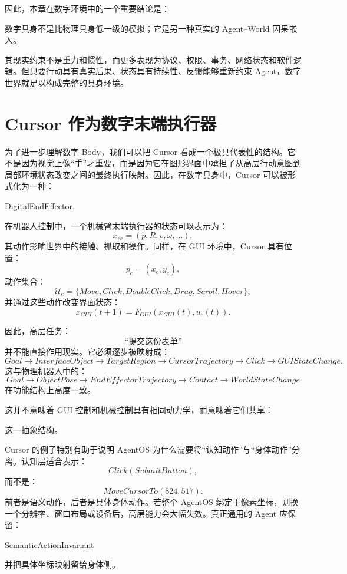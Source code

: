 因此，本章在数字环境中的一个重要结论是：
\begin{conclusion}
数字具身不是比物理具身低一级的模拟；它是另一种真实的 Agent--World 因果嵌入。
\end{conclusion}
其现实约束不是重力和惯性，而更多表现为协议、权限、事务、网络状态和软件逻辑。但只要行动具有真实后果、状态具有持续性、反馈能够重新约束 Agent，数字世界就足以构成完整的具身环境。

\section{Cursor 作为数字末端执行器}

为了进一步理解数字 Body，我们可以把 Cursor 看成一个极具代表性的结构。它不是因为视觉上像“手”才重要，而是因为它在图形界面中承担了从高层行动意图到局部环境状态改变之间的最终执行映射。因此，在数字具身中，Cursor 可以被形式化为一种：
\begin{statementbox}
DigitalEndEffector.
\end{statementbox}

在机器人控制中，一个机械臂末端执行器的状态可以表示为：
\[
x_{ee}
=
(p,R,v,\omega,\ldots),
\]
其动作影响世界中的接触、抓取和操作。同样，在 GUI 环境中，Cursor 具有位置：
\[
p_c=(x_c,y_c),
\]
动作集合：
\[
\mathcal U_c
=
\{
Move,
Click,
DoubleClick,
Drag,
Scroll,
Hover
\},
\]
并通过这些动作改变界面状态：
\[
x_{GUI}(t+1)
=
F_{GUI}
\left(
x_{GUI}(t),
u_c(t)
\right).
\]

因此，高层任务：
\[
\text{“提交这份表单”}
\]
并不能直接作用现实。它必须逐步被映射成：
\[
Goal
\rightarrow
InterfaceObject
\rightarrow
TargetRegion
\rightarrow
CursorTrajectory
\rightarrow
Click
\rightarrow
GUIStateChange.
\]
这与物理机器人中的：
\[
Goal
\rightarrow
ObjectPose
\rightarrow
EndEffectorTrajectory
\rightarrow
Contact
\rightarrow
WorldStateChange
\]
在功能结构上高度一致。

这并不意味着 GUI 控制和机械控制具有相同动力学，而意味着它们共享：
\begin{statementbox}
\centering
{}
\end{statementbox}
这一抽象结构。

Cursor 的例子特别有助于说明 AgentOS 为什么需要将“认知动作”与“身体动作”分离。认知层适合表示：
\[
Click(
SubmitButton
),
\]
而不是：
\[
MoveCursorTo(824,517).
\]
前者是语义动作，后者是具体身体动作。若整个 AgentOS 绑定于像素坐标，则换一个分辨率、窗口布局或设备后，高层能力会大幅失效。真正通用的 Agent 应保留：
\begin{statementbox}
SemanticActionInvariant
\end{statementbox}
并把具体坐标映射留给身体侧。

